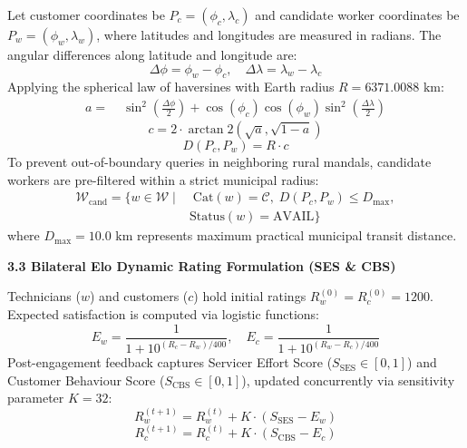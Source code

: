 \documentclass[10pt,twocolumn,a4paper]{article}
\begin{document}
Let customer coordinates be $P_c = (\phi_c, \lambda_c)$ and candidate worker coordinates be $P_w = (\phi_w, \lambda_w)$, where latitudes and longitudes are measured in radians. The angular differences along latitude and longitude are:
\begin{equation}
\Delta\phi = \phi_w - \phi_c, \quad \Delta\lambda = \lambda_w - \lambda_c
\end{equation}
Applying the spherical law of haversines with Earth radius $R = 6371.0088\text{ km}$:
\begin{equation}
\begin{aligned}
a = &\; \sin^2\left(\frac{\Delta\phi}{2}\right) + \cos(\phi_c)\cos(\phi_w)\sin^2\left(\frac{\Delta\lambda}{2}\right)
\end{aligned}
\end{equation}
\begin{equation}
c = 2 \cdot \arctan2\left(\sqrt{a}, \sqrt{1 - a}\right)
\end{equation}
\begin{equation}
D(P_c, P_w) = R \cdot c
\end{equation}
To prevent out-of-boundary queries in neighboring rural mandals, candidate workers are pre-filtered within a strict municipal radius:
\begin{equation}
\begin{aligned}
\mathcal{W}_{\text{cand}} = \{ w \in \mathcal{W} \mid &\; \text{Cat}(w) = \mathcal{C}, \; D(P_c, P_w) \le D_{\max}, \\
& \text{Status}(w) = \text{AVAIL} \}
\end{aligned}
\end{equation}
where $D_{\max} = 10.0\text{ km}$ represents maximum practical municipal transit distance.

\vspace{0.25em}
\noindent
\textbf{3.3 Bilateral Elo Dynamic Rating Formulation (SES \& CBS)}

Technicians ($w$) and customers ($c$) hold initial ratings $R_w^{(0)} = R_c^{(0)} = 1200$. Expected satisfaction is computed via logistic functions:
\begin{equation}
E_w = \frac{1}{1 + 10^{(R_c - R_w)/400}}, \quad E_c = \frac{1}{1 + 10^{(R_w - R_c)/400}}
\end{equation}
Post-engagement feedback captures Servicer Effort Score ($S_{\text{SES}} \in [0, 1]$) and Customer Behaviour Score ($S_{\text{CBS}} \in [0, 1]$), updated concurrently via sensitivity parameter $K = 32$:
\begin{equation}
R_w^{(t+1)} = R_w^{(t)} + K \cdot (S_{\text{SES}} - E_w)
\end{equation}
\begin{equation}
R_c^{(t+1)} = R_c^{(t)} + K \cdot (S_{\text{CBS}} - E_c)
\end{equation}
\end{document}
